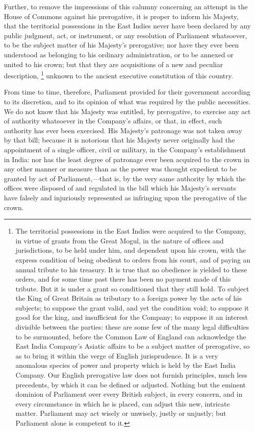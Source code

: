 Further, to remove the impressions of this calumny concerning an attempt in the House of Commons against his prerogative, it is proper to inform his Majesty, that the territorial possessions in the East Indies never have been declared by any public judgment, act, or instrument, or any resolution of Parliament whatsoever, to be the subject matter of his Majesty's prerogative; nor have they ever been understood as belonging to his ordinary administration, or to be annexed or united to his crown; but that they are acquisitions of a new and peculiar description, 
\footnote{ The territorial possessions in the East Indies were acquired to the Company, in virtue of grants from the Great Mogul, in the nature of offices and jurisdictions, to be held under him, and dependent upon his crown, with the express condition of being obedient to orders from his court, and of paying an annual tribute to his treasury. It is true that no obedience is yielded to these orders, and for some time past there has been no payment made of this tribute. But it is under a grant so conditioned that they still hold. To subject the King of Great Britain as tributary to a foreign power by the acts of his subjects; to suppose the grant valid, and yet the condition void; to suppose it good for the king, and insufficient for the Company; to suppose it an interest divisible between the parties: these are some few of the many legal difficulties to be surmounted, before the Common Law of England can acknowledge the East India Company's Asiatic affairs to be a subject matter of prerogative, so as to bring it within the verge of English jurisprudence. It is a very anomalous species of power and property which is held by the East India Company. Our English prerogative law does not furnish principles, much less precedents, by which it can be defined or adjusted. Nothing but the eminent dominion of Parliament over every British subject, in every concern, and in every circumstance in which he is placed, can adjust this new, intricate matter. Parliament may act wisely or unwisely, justly or unjustly; but Parliament alone is competent to it.}
 unknown to the ancient executive constitution of this country.

From time to time, therefore, Parliament provided for their government according to its discretion, and to its opinion of what was required by the public necessities. We do not know that his Majesty was entitled, by prerogative, to exercise any act of authority whatsoever in the Company's affairs, or that, in effect, such authority has ever been exercised. His Majesty's patronage was not taken away by that bill; because it is notorious that his Majesty never originally had the appointment of a single officer, civil or military, in the Company's establishment in India: nor has the least degree of patronage ever been acquired to the crown in any other manner or measure than as the power was thought expedient to be granted by act of Parliament,—that is, by the very same authority by which the offices were disposed of and regulated in the bill which his Majesty's servants have falsely and injuriously represented as infringing upon the prerogative of the crown.

